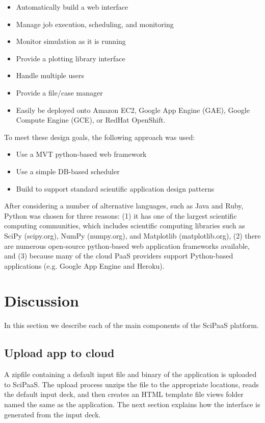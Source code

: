 \documentclass[10pt,reprint]{socc14}
\begin{document}
\begin{itemize}
\item Automatically build a web interface
\item Manage job execution, scheduling, and monitoring
\item Monitor simulation as it is running
\item Provide a plotting library interface
\item Handle multiple users
\item Provide a file/case manager
\item Easily be deployed onto Amazon EC2, Google App Engine (GAE), Google Compute Engine (GCE), or RedHat OpenShift.
\end{itemize}

To meet these design goals, the following approach was used:

\begin{itemize}
\item Use a MVT python-based web framework
\item Use a simple DB-based scheduler
\item Build to support standard scientific application design patterns
\end{itemize}

After considering a number of alternative languages, such as Java and Ruby, Python was chosen for three reasons: (1) it has one of the largest scientific computing communities, which includes scientific computing libraries such as SciPy (scipy.org), NumPy (numpy.org), and Matplotlib (matplotlib.org), (2) there are numerous open-source python-based web application frameworks available, and (3) because many of the cloud PaaS providers support Python-based applications (e.g. Google App Engine and Heroku). 

\section{Discussion}

In this section we describe each of the main components of the SciPaaS platform.

\subsection{Upload app to cloud}

A zipfile containing a default input file and binary of the application is uploaded to SciPaaS.  The upload process unzips the file to the appropriate locations, reads the default input deck, and then creates an HTML template file views folder named the same as the application.  The next section explains how the interface is generated from the input deck.
\end{document}
